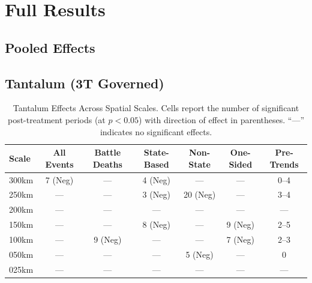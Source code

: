 \documentclass[11pt]{article}
\begin{document}
\section{Full Results}
\setcounter{table}{0}
\setcounter{figure}{0}


\subsection{Pooled Effects}



\subsection{Tantalum (3T Governed)}







\begin{table}[H]
\centering
\caption{Tantalum Effects Across Spatial Scales. Cells report the number of significant post-treatment periods (at $p<0.05$) with direction of effect in parentheses. ``---'' indicates no significant effects.}
\label{tab:tantalum_robustness}
\begin{tabular}{lcccccc}
\toprule
Scale & All Events & Battle Deaths & State-Based & Non-State & One-Sided & Pre-Trends \\
\midrule
300km & 7 (Neg)   & ---           & 4 (Neg)     & ---       & ---       & 0--4       \\
250km & ---       & ---           & 3 (Neg)     & 20 (Neg)  & ---       & 3--4       \\
200km & ---       & ---           & ---         & ---       & ---       & ---        \\
150km & ---       & ---           & 8 (Neg)     & ---       & 9 (Neg)   & 2--5       \\
100km & ---       & 9 (Neg)       & ---         & ---       & 7 (Neg)   & 2--3       \\
050km & ---       & ---           & ---         & 5 (Neg)   & ---       & 0          \\
025km & ---       & ---           & ---         & ---       & ---       & ---        \\
\bottomrule
\end{tabular}
\end{table}
\end{document}
